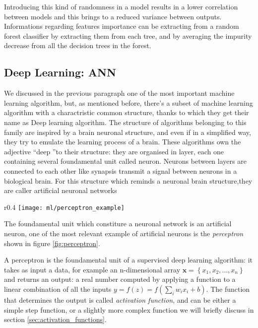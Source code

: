\documentclass[a4paper,11pt]{article}
\begin{document}
Introducing this kind of randomness in a model results in a lower correlation between models and this brings to a reduced variance between outputs.
Informations regarding features importance can be extracting from a random forest classifier by extracting them from each tree, and by averaging the impurity decrease from all the decision trees in the forest.



\subsection{Deep Learning: ANN}

We discussed in the previous paragraph one of the most important machine learning algorithm, but, as mentioned before, there's a subset of machine learning algorithm with a charactristic common structure, thanks to which they get their name as Deep learning algorithm.
The structure of algorithms belonging to this family are inspired by a brain neuronal structure, and even if in a simplified way, they try to emulate the learning process of a brain.
These algorithms own the adjective \textquotedblleft deep \textquotedblright to their structure: they are organised in layer, each one containing several foundamental unit called neuron.
Neurons between layers are connected to each other like synapsis transmit a signal between neurons in a biological brain.
For this structure which reminds a neuronal brain structure,they are caller artificial neuronal networks

\begin{wrapfigure}{r}{0.4\textwidth}
\centering
\texttt{[image: ml/perceptron\_example]}
\caption{Perceptron}
\label{fig:perceptron}
\end{wrapfigure}

The foundamental unit which constiture a neuronal network is an artificial neuron, one of the most relevant example of artificial neurons is the \emph{perceptron} shown in figure \ref{fig:perceptron}.

A perceptron is the foundamental unit of a supervised deep learning algorithm: it takes as input a data, for example an n-dimensional array $\textbf{x} = \left\{ x_1, x_2, ..., x_n\right\}$ and returns an output: a real number computed by applying a function to a linear combination of all the inputs $ y = f(z) = f \left ( \sum_i w_{i} x_i + b \right )$.
The function that determines the output is called \emph{activation function}, and can be either a simple step function, or a slightly more complex function we will briefly discuss in section \ref{sec:activation_functions}.
\end{document}
